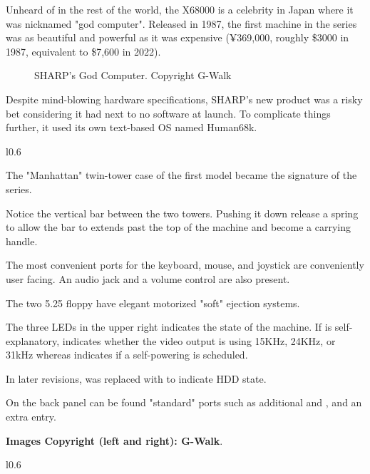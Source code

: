 Unheard of in the rest of the world, the X68000 is a celebrity in Japan where it was nicknamed "god computer". 
Released in 1987, the first machine in the series was as beautiful and powerful as it was expensive (¥369,000, roughly \$3000 in 1987, equivalent to \$7,600 in 2022).

\vfill

 \begin{figure}[H]
\caption*{SHARP's God Computer. Copyright G-Walk\cite{x68k_perfect_catalogue}}
\end{figure}


Despite mind-blowing hardware specifications, SHARP's new product was a risky bet considering it had next to no software at launch. To complicate things further, it used its own text-based OS named Human68k.


\begin{wrapfigure}[35]{l}{0.6\textwidth}
\centering
{}
\end{wrapfigure}

The "Manhattan" twin-tower case of the first model became the signature of the series. 

Notice the vertical bar between the two towers. Pushing it down release a spring to allow the bar to extends past the top of the machine and become a carrying handle.


The most convenient ports for the keyboard, mouse, and joystick are conveniently user facing. An audio jack and a volume control are also present.

The two 5.25 floppy have elegant motorized "soft" ejection systems.

The three LEDs in the upper right indicates the state of the machine. If  is self-explanatory,  indicates whether the video output is using 15KHz, 24KHz, or 31kHz whereas  indicates if a self-powering is scheduled. 

In later revisions,  was replaced with  to indicate HDD state.

On the back panel can be found "standard" ports such as additional  and , and an extra  entry.  

\textbf{Images Copyright (left and right): G-Walk\cite{x68k_perfect_catalogue}}.
\pagebreak

\begin{wrapfigure}[35]{l}{0.6\textwidth}
\centering
{}
\end{wrapfigure}



